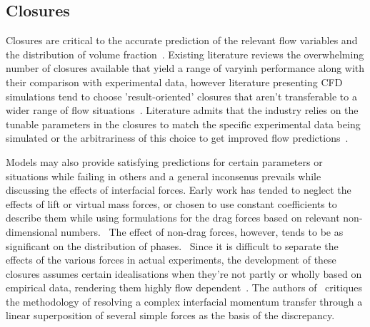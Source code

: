 

\subsection{Closures}\label{sec:closures}
Closures are critical to the accurate prediction of the relevant flow variables and the distribution
 of volume fraction~\cite{sugrueRobustMomentumClosure}. Existing literature reviews 
 the overwhelming number of closures available that yield a range of varyinh performance 
 along with their comparison with experimental data, however literature
 presenting CFD simulations tend to choose 'result-oriented' closures that aren't
 transferable to a wider range of flow situations~\cite{krepperValidationClosureModel2018, sugrueAssessmentSimplifiedSet2017}.
 Literature admits that the industry relies on the tunable parameters in the closures to 
 match the specific experimental data being simulated or the arbitrariness of this choice
 to get improved flow predictions~.
 
Models may also provide satisfying predictions for certain parameters or situations while
 failing in others and a general inconsenus prevails while discussing the effects of interfacial
 forces. Early work has tended to neglect 
 the effects of lift or virtual mass forces, or chosen to use constant coefficients to 
 describe them while using formulations for the drag forces based on 
 relevant non-dimensional numbers.~\cite{liaoEulerianModellingTurbulent2018}
 The effect of non-drag forces, however, tends to be as significant on the 
 distribution of phases.~
 Since it is 
 difficult to separate the effects of the various forces in actual experiments,
 the development of these closures assumes certain idealisations when they're not
 partly or wholly based on empirical data, rendering them highly flow 
 dependent~. The authors 
 of~ critiques the methodology of resolving a 
 complex interfacial momentum transfer through a linear superposition 
 of several simple forces as the basis of the discrepancy.
 
